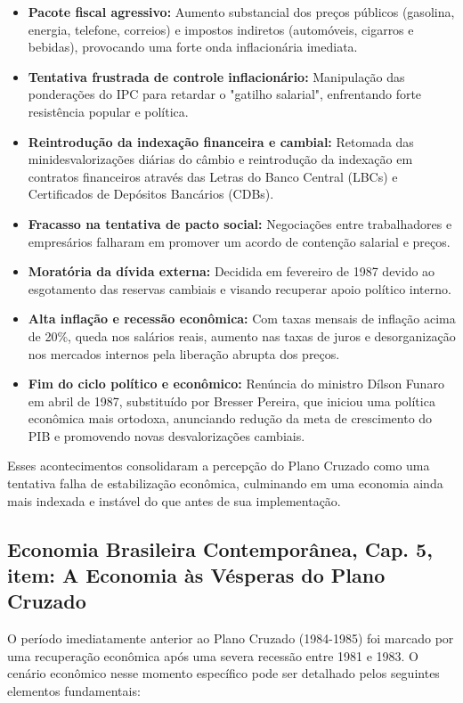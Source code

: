 \documentclass[a4paper,12pt]{article}[abntex2]
\begin{document}
\begin{itemize}
    \item \textbf{Pacote fiscal agressivo:} Aumento substancial dos preços públicos (gasolina, energia, telefone, correios) e impostos indiretos (automóveis, cigarros e bebidas), provocando uma forte onda inflacionária imediata.
    \item \textbf{Tentativa frustrada de controle inflacionário:} Manipulação das ponderações do IPC para retardar o "gatilho salarial", enfrentando forte resistência popular e política.
    \item \textbf{Reintrodução da indexação financeira e cambial:} Retomada das minidesvalorizações diárias do câmbio e reintrodução da indexação em contratos financeiros através das Letras do Banco Central (LBCs) e Certificados de Depósitos Bancários (CDBs).
    \item \textbf{Fracasso na tentativa de pacto social:} Negociações entre trabalhadores e empresários falharam em promover um acordo de contenção salarial e preços.
    \item \textbf{Moratória da dívida externa:} Decidida em fevereiro de 1987 devido ao esgotamento das reservas cambiais e visando recuperar apoio político interno.
    \item \textbf{Alta inflação e recessão econômica:} Com taxas mensais de inflação acima de 20\%, queda nos salários reais, aumento nas taxas de juros e desorganização nos mercados internos pela liberação abrupta dos preços.
    \item \textbf{Fim do ciclo político e econômico:} Renúncia do ministro Dílson Funaro em abril de 1987, substituído por Bresser Pereira, que iniciou uma política econômica mais ortodoxa, anunciando redução da meta de crescimento do PIB e promovendo novas desvalorizações cambiais.
\end{itemize}

Esses acontecimentos consolidaram a percepção do Plano Cruzado como uma tentativa falha de estabilização econômica, culminando em uma economia ainda mais indexada e instável do que antes de sua implementação.

\subsection{\textbf{Economia Brasileira Contemporânea, Cap. 5, item: A Economia às Vésperas do Plano Cruzado}}

O período imediatamente anterior ao Plano Cruzado (1984-1985) foi marcado por uma recuperação econômica após uma severa recessão entre 1981 e 1983. O cenário econômico nesse momento específico pode ser detalhado pelos seguintes elementos fundamentais:
\end{document}
